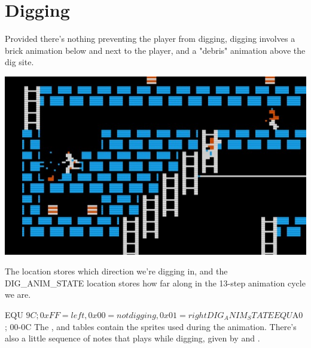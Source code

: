 \documentclass[10pt]{report}%
\begin{document}
\section{Digging}

Provided there's nothing preventing the player from digging, digging involves a brick animation
below and next to the player, and a "debris" animation above the dig site.

\begin{center}
\includegraphics[width=\columnwidth]{digging}
\end{center}

The {\Tt{}\nwendquote} location stores which direction we're digging in, and the {\Tt{}DIG{\_}ANIM{\_}STATE\nwendquote}
location stores how far along in the 13-step animation cycle we are.

\nwenddocs{}\plusendmoddef\nwstartdeflinemarkup{}\nwenddeflinemarkup
{}       EQU     $9C     ; 0xFF = left, 0x00 = not digging, 0x01 = right
DIG_ANIM_STATE      EQU     $A0     ; 00-0C
\eatline
{}\nwendcode{}\nwdocspar
The {\Tt{}\nwendquote}, {\Tt{}\nwendquote} and {\Tt{}\nwendquote} tables
contain the sprites used during
the animation. There's also a little sequence of notes that plays while digging, given by
{\Tt{}\nwendquote} and {\Tt{}\nwendquote}.
\end{document}
